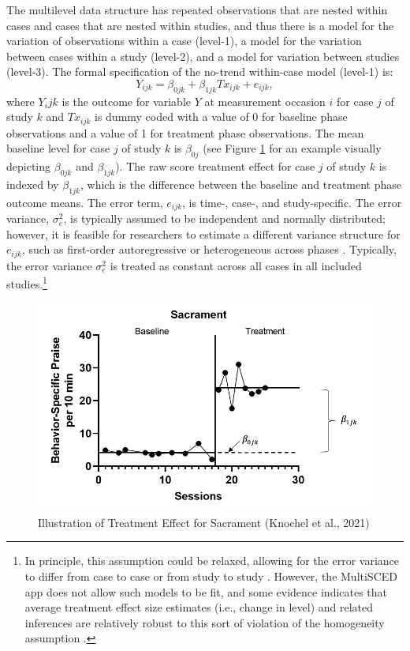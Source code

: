 \documentclass[
]{book}
\begin{document}
The multilevel data structure has repeated observations that are nested within cases and cases that are nested within studies, and thus there is a model for the variation of observations within a case (level-1), a model for the variation between cases within a study (level-2), and a model for variation between studies (level-3). The formal specification of the no-trend within-case model (level-1) is:
\begin{equation}
\label{eq:MLM-L1-noTrend}
Y_{ijk} = \beta_{0jk} + \beta_{1jk}Tx_{ijk} + e_{ijk},
\end{equation}
where \(Y_ijk\) is the outcome for variable \(Y\) at measurement occasion \(i\) for case \(j\) of study \(k\) and \(Tx_{ijk}\) is dummy coded with a value of 0 for baseline phase observations and a value of 1 for treatment phase observations. The mean baseline level for case \(j\) of study \(k\) is \(\beta_{0j}\) (see Figure \ref{fig:Knochel-Sacrament-2021} for an example visually depicting \(\beta_{0jk}\) and \(\beta_{1jk}\)). The raw score treatment effect for case \(j\) of study \(k\) is indexed by \(\beta_{1jk}\), which is the difference between the baseline and treatment phase outcome means. The error term, \(e_{ijk}\), is time-, case-, and study-specific. The error variance, \(\sigma_e^2\), is typically assumed to be independent and normally distributed; however, it is feasible for researchers to estimate a different variance structure for \(e_{ijk}\), such as first-order autoregressive or heterogeneous across phases \citep{Joo_et_al_2019, Petit-Bois_2014}. Typically, the error variance \(\sigma_e^2\) is treated as constant across all cases in all included studies.\footnote{In principle, this assumption could be relaxed, allowing for the error variance to differ from case to case or from study to study \citep{baek_Ferron_2020}. However, the MultiSCED app does not allow such models to be fit, and some evidence indicates that average treatment effect size estimates (i.e., change in level) and related inferences are relatively robust to this sort of violation of the homogeneity assumption \citep{baek_Ferron_2020}.}

\begin{figure}
\includegraphics[width=0.6\linewidth]{images/Knochel2021_Sacrament} \caption{Illustration of Treatment Effect for Sacrament (Knochel et al., 2021)}\label{fig:Knochel-Sacrament-2021}
\end{figure}
\end{document}
